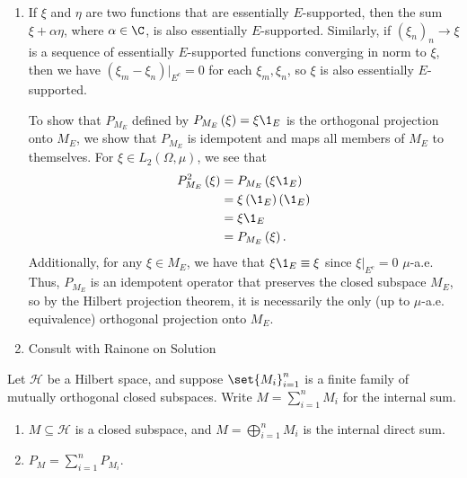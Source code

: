 \documentclass[10pt]{mypackage}
\begin{document}
\begin{solution}[]\hfill
  \begin{enumerate}[(1)]
    \item If $\xi$ and $\eta$ are two functions that are essentially $E$-supported, then the sum $\xi + \alpha \eta$, where $\alpha\in \C$, is also essentially $E$-supported. Similarly, if $\left(\xi_n\right)_n\rightarrow \xi$ is a sequence of essentially $E$-supported functions converging in norm to $\xi$, then we have $\left(\xi_m - \xi_{n}\right)|_{E^{c}} = 0$ for each $\xi_{m},\xi_{n}$, so $\xi$ is also essentially $E$-supported.\newline

      To show that $P_{M_E}$ defined by $P_{M_E}\left(\xi\right) = \xi \1_{E}$ is the orthogonal projection onto $M_{E}$, we show that $P_{M_E}$ is idempotent and maps all members of $M_{E}$ to themselves. For $\xi\in L_{2}\left(\Omega,\mu\right)$, we see that
      \begin{align*}
        P_{M_E}^2\left(\xi\right) &= P_{M_E}\left(\xi \1_{E}\right)\\
                                  &= \xi\left(\1_{E}\right)\left(\1_{E}\right)\\
                                  &= \xi \1_{E}\\
                                  &= P_{M_E}\left(\xi\right).
      \end{align*}
      Additionally, for any $\xi\in M_{E}$, we have that $\xi \1_{E} \equiv \xi$ since $\xi|_{E^c} = 0$ $\mu$-a.e. Thus, $P_{M_E}$ is an idempotent operator that preserves the closed subspace $M_{E}$, so by the Hilbert projection theorem, it is necessarily the only (up to $\mu$-a.e. equivalence) orthogonal projection onto $M_{E}$.
    \item Consult with Rainone on Solution
  \end{enumerate}
\end{solution}
\begin{proposition}
  Let $\mathcal{H}$ be a Hilbert space, and suppose $\set{M_i}_{i=1}^{n}$ is a finite family of mutually orthogonal closed subspaces. Write $M = \sum_{i=1}^{n}M_i$ for the internal sum.
  \begin{enumerate}[(1)]
    \item $M\subseteq \mathcal{H}$ is a closed subspace, and $M = \bigoplus_{i=1}^{n}M_i$ is the internal direct sum.
    \item $P_{M} = \sum_{i=1}^{n}P_{M_i}$.
  \end{enumerate}
\end{proposition}
\end{document}
